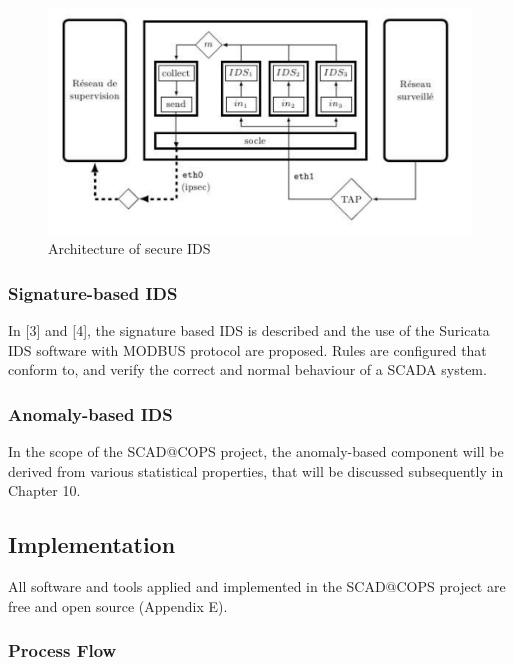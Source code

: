 \documentclass[11pt,a4paper]{article}
\begin{document}
\begin{figure}[h]

{\centering \includegraphics{thesis_files/figure-latex/unnamed-chunk-36-1} 

}

\caption{Architecture of secure IDS }\label{fig:unnamed-chunk-36}
\end{figure}

\subsubsection{Signature-based IDS}\label{signature-based-ids}

In {[}3{]} and {[}4{]}, the signature based IDS is described and the use
of the Suricata IDS software with MODBUS protocol are proposed. Rules
are configured that conform to, and verify the correct and normal
behaviour of a SCADA system.

\subsubsection{Anomaly-based IDS}\label{anomaly-based-ids}

In the scope of the SCAD@COPS project, the anomaly-based component will
be derived from various statistical properties, that will be discussed
subsequently in Chapter 10.

\subsection{Implementation}\label{implementation}

All software and tools applied and implemented in the SCAD@COPS project
are free and open source (Appendix E).

\subsubsection{Process Flow}\label{process-flow}
\end{document}
